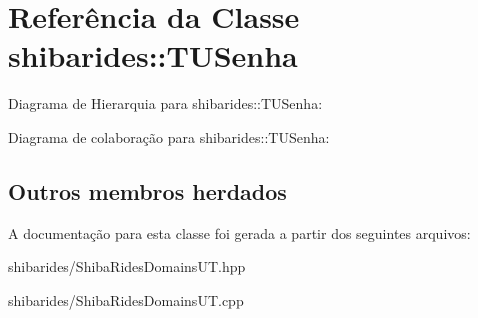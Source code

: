 \hypertarget{classshibarides_1_1TUSenha}{}\section{Referência da Classe shibarides\+:\+:T\+U\+Senha}
\label{classshibarides_1_1TUSenha}


Diagrama de Hierarquia para shibarides\+:\+:T\+U\+Senha\+:


Diagrama de colaboração para shibarides\+:\+:T\+U\+Senha\+:
\subsection*{Outros membros herdados}


A documentação para esta classe foi gerada a partir dos seguintes arquivos\+:\begin{DoxyCompactItemize}
\item 
shibarides/Shiba\+Rides\+Domains\+U\+T.\+hpp\item 
shibarides/Shiba\+Rides\+Domains\+U\+T.\+cpp\end{DoxyCompactItemize}
